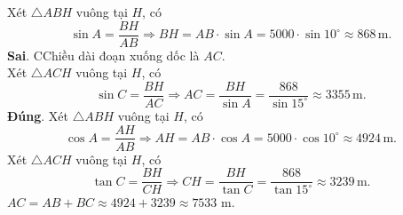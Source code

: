 \begin{ex}
{\begin{itemchoice}
	Xét $\triangle ABH$ vuông tại $H$, có 
	$$\sin A = \dfrac{BH}{AB} \Rightarrow BH = AB \cdot \sin A = 5000 \cdot \sin 10^\circ \approx 868\,\mathrm{m}.$$
	\itemch \textbf{Sai}. CChiều dài đoạn xuống dốc là $AC$.\\
	Xét $\triangle ACH$ vuông tại $H$, có 
	$$\sin C = \dfrac{BH}{AC} \Rightarrow AC = \dfrac{BH}{\sin A} = \dfrac{868}{\sin 15^\circ} \approx 3355\,\mathrm{m}.$$
	\itemch \textbf{Đúng}. Xét $\triangle ABH$ vuông tại $H$, có 
	$$\cos A = \dfrac{AH}{AB} \Rightarrow AH = AB \cdot \cos A = 5000 \cdot \cos 10^\circ \approx 4924\,\mathrm{m}.$$
	Xét $\triangle ACH$ vuông tại $H$, có 
	$$\tan C = \dfrac{BH}{CH} \Rightarrow CH = \dfrac{BH}{\tan C} = \dfrac{868}{\tan 15^\circ} \approx 3239\,\mathrm{m}.$$
	$AC = AB + BC \approx 4924 + 3239 \approx 7533$ m.
	\end{itemchoice}
	}
\end{ex}
